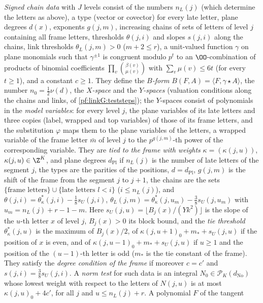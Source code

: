 \begin{definition}
\emph{Signed chain data} with $J$ levels consist of the numbers $n_L(j)$ (which determine the letters as above), a type
(vector or covector) for every late letter, plane degrees $d(x)$, exponents $g(j,m)$, increasing chains of sets of letters of
level $j$ containing all frame letters, thresholds $\theta(j,i)$ and slopes $s(j,i)$ along the chains, link thresholds
$\theta_L(j,m)>0$ ($m+2\le r$), a unit-valued function $\gamma$ on plane monomials such that $\gamma^{\pm1}$ is congruent modulo $p^t$
to an $\OO$-combination of products of binomial coefficients $\prod_v\binom{\beta(v)}{\mu(v)}$ with $\sum_v\mu(v)\le6t$ (for every
$t\ge1$), and a constant $c\ge1$. They define the \emph{$B$-form} $B(F,A)=\langle F,\gamma\star A\rangle$, the number $n_0=\frac12\nu(d)$,
the \emph{$X$-space} and the \emph{$Y$-spaces} (valuation conditions along the chains and links, of
\cref{pf:linkG:teststeps}); the $Y$-spaces consist of polynomials in the \emph{model variables}: for every level $j$, the plane
variables of its late letters and three copies (label, wrapped and top variables) of those of its frame letters, and the substitution
$\varphi$ maps them to the plane variables of the letters, a wrapped variable of the frame letter $\bar m$ of level $j$ to the
$p^{g(j,m)}$-th power of the corresponding variable. They are \emph{tied to the frame with weights} $\kappa=(\kappa(j,u))$, $\kappa(j,u)\in\Z^K$, and plane
degrees $d_{\mathrm{Pl}}$ if $n_L(j)$ is the number of late letters of the segment $j$, the types are the parities of the positions,
$d=d_{\mathrm{Pl}}$, $g(j,m)$ is the shift of the frame from the segment $j$ to $j+1$, the chains are the sets
$\{\text{frame letters}\}\cup\{\text{late letters }l<i\}$ ($i\le n_L(j)$), and
$\theta(j,i)=\theta^*_\kappa(j,i)-\frac18s_U(j,i)$, $\theta_L(j,m)=\theta^*_\kappa(j,u_m)-\frac38s_U(j,u_m)$ with $u_m=n_L(j)+r-1-m$. Here
$s_U(j,u)=\lfloor B_j(x)/(Yk^2)\rfloor$ is the slope of the $u$-th letter $x$ of level $j$, $B_j(x)>0$ its block bound, and the
\emph{tie threshold} $\theta^*_\kappa(j,u)$ is the maximum of $B_j(x)/2$, of $\kappa(j,u+1)_0+m_*+s_U(j,u)$ if the position of $x$ is
even, and of $\kappa(j,u-1)_0+m_*+s_U(j,u)$ if $u\ge1$ and the position of the $(u-1)$-th letter is odd ($m_*$ is the tie constant of
the frame). They satisfy the \emph{degree condition of the frame} if moreover $c=c'$ and
$s(j,i)=\frac38s_U(j,i)$. A \emph{norm test} for such data is an integral $N_0\in\mathcal P_K(d_{\mathrm{No}})$ whose lowest weight with
respect to the letters of $N(j,u)$ is at most $\kappa(j,u)_0+4c'$, for all $j$ and $u\le n_L(j)+r$. A polynomial $F$ of the tangent

\end{definition}
